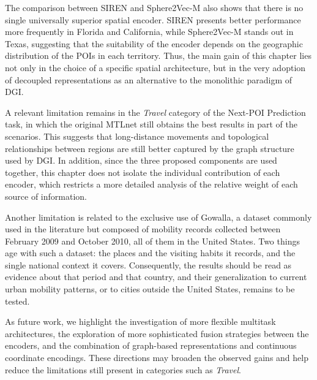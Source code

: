 The comparison between SIREN and Sphere2Vec-M also shows that there is no single universally superior spatial encoder. SIREN presents better performance more frequently in Florida and California, while Sphere2Vec-M stands out in Texas, suggesting that the suitability of the encoder depends on the geographic distribution of the POIs in each territory. Thus, the main gain of this chapter lies not only in the choice of a specific spatial architecture, but in the very adoption of decoupled representations as an alternative to the monolithic paradigm of DGI.

A relevant limitation remains in the \textit{Travel} category of the Next-POI Prediction task, in which the original MTLnet still obtains the best results in part of the scenarios. This suggests that long-distance movements and topological relationships between regions are still better captured by the graph structure used by DGI. In addition, since the three proposed components are used together, this chapter does not isolate the individual contribution of each encoder, which restricts a more detailed analysis of the relative weight of each source of information.

Another limitation is related to the exclusive use of Gowalla, a dataset commonly used in the literature but composed of mobility records collected between February 2009 and October 2010, all of them in the United States. Two things age with such a dataset: the places and the visiting habits it records, and the single national context it covers. Consequently, the results should be read as evidence about that period and that country, and their generalization to current urban mobility patterns, or to cities outside the United States, remains to be tested.

As future work, we highlight the investigation of more flexible multitask architectures, the exploration of more sophisticated fusion strategies between the encoders, and the combination of graph-based representations and continuous coordinate encodings. These directions may broaden the observed gains and help reduce the limitations still present in categories such as \textit{Travel}.
